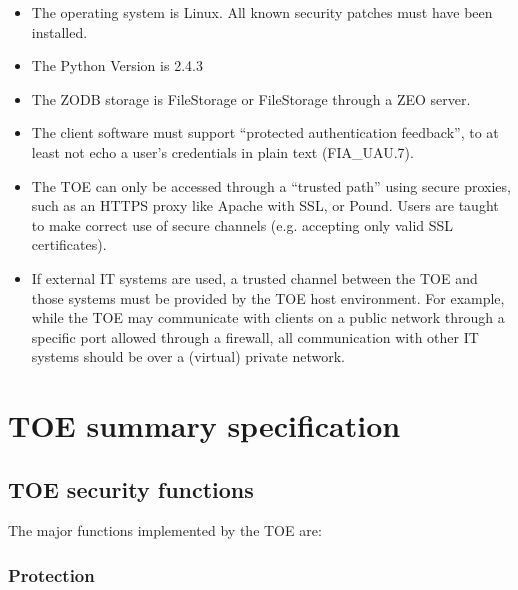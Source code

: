 \documentclass[12pt,english]{scrbook}
\begin{document}
\begin{itemize}

  \item The operating system is Linux. All known security patches must have
    been installed.

  \item The Python Version is 2.4.3

  \item The ZODB storage is FileStorage or FileStorage through a ZEO server.

  \item The client software must support ``protected authentication feedback'',
      to at least not echo a user's credentials in plain text (FIA{\_}UAU.7).

  \item The TOE can only be accessed through a ``trusted path'' using secure
      proxies, such as an HTTPS proxy like Apache with SSL, or Pound. Users are
      taught to make correct use of secure channels (e.g. accepting only valid
      SSL certificates). 

  \item If external IT systems are used, a trusted channel between the TOE and
      those systems must be provided by the TOE host environment.  For example,
      while the TOE may communicate with clients on a public network through a
      specific port allowed through a firewall, all communication with other IT
      systems should be over a (virtual) private network.

\end{itemize}

\chapter{TOE summary specification}


\section{TOE security functions}  \label{toe-sec-funcs}


The major functions implemented by the TOE are:




\subsection{Protection}
\end{document}
